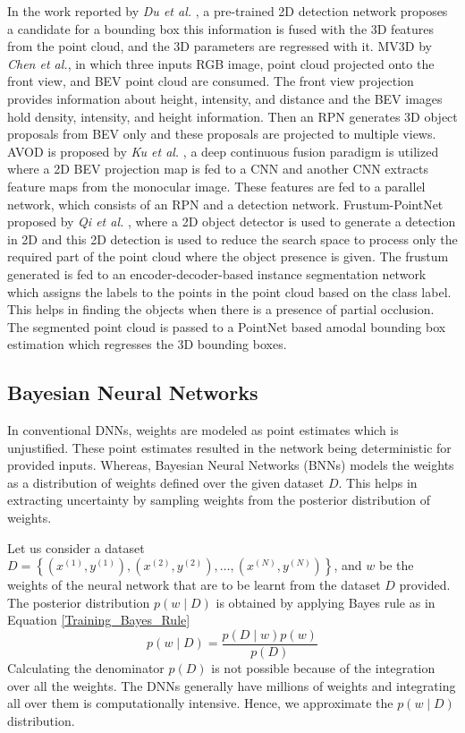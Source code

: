 \documentclass[10pt,twocolumn,letterpaper]{article}
\begin{document}
In the work reported by \textit{Du et al.} \cite{Du2018}, a pre-trained 2D detection network proposes a candidate for a bounding box this information is fused with the 3D features from the point cloud, and the 3D parameters are regressed with it. MV3D \cite{MV3D2017} by \textit{Chen et al.}, in which three inputs RGB image, point cloud projected onto the front view, and BEV point cloud are consumed. The front view projection provides information about height, intensity, and distance and the BEV images hold density, intensity, and height information. Then an RPN generates 3D object proposals from BEV only and these proposals are projected to multiple views. AVOD is proposed by \textit{Ku et al.} \cite{AVOD2018}, a deep continuous fusion paradigm is utilized where a 2D BEV projection map is fed to a CNN and another CNN extracts feature maps from the monocular image. These features are fed to a parallel network, which consists of an RPN and a detection network. Frustum-PointNet proposed by \textit{Qi et al.} \cite{FPointnet2018}, where a 2D object detector is used to generate a detection in 2D and this 2D detection is used to reduce the search space to process only the required part of the point cloud where the object presence is given. The frustum generated is fed to an encoder-decoder-based instance segmentation network which assigns the labels to the points in the point cloud based on the class label. This helps in finding the objects when there is a presence of partial occlusion. The segmented point cloud is passed to a PointNet \cite{Pointnet2017} based amodal bounding box estimation which regresses the 3D bounding boxes.

\subsection{Bayesian Neural Networks}
In conventional DNNs, weights are modeled as point estimates which is unjustified. These point estimates resulted in the network being deterministic for provided inputs. Whereas, Bayesian Neural Networks (BNNs) models the weights as a distribution of weights defined over the given dataset $D$. This helps in extracting uncertainty by sampling weights from the posterior distribution of weights.

Let us consider a dataset $D=\left\{\left(x^{(1)}, y^{(1)}\right),\left(x^{(2)}, y^{(2)}\right), \ldots,\left(x^{(N)}, y^{(N)}\right)\right\}$, and $w$ be the weights of the neural network that are to be learnt from the dataset $D$ provided. The posterior distribution $p(w \mid D)$ is obtained by applying Bayes rule as in Equation \ref{Training_Bayes_Rule}
    \begin{equation}
        \label{Training_Bayes_Rule}
        p(w \mid D)=\frac{p(D \mid w) p(w)}{p(D)}
    \end{equation}
Calculating the denominator $p(D)$ is not possible because of the integration over all the weights. The DNNs generally have millions of weights and integrating all over them is computationally intensive. Hence, we approximate the $p(w \mid D)$ distribution.
\end{document}
